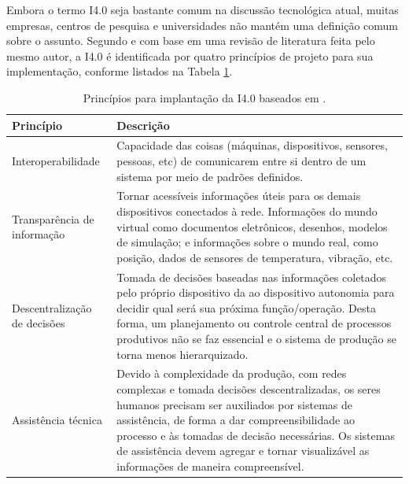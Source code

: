 \documentclass[
	12pt,				%
	oneside,			%
	a4paper,			%
	english,			%
	brazil				%
]{abntex2}
\begin{document}
	Embora o termo I4.0 seja bastante comum na discussão tecnológica atual, muitas empresas, centros de pesquisa e universidades não mantém uma definição comum sobre o assunto. Segundo  e com base em uma revisão de literatura feita pelo mesmo autor, a I4.0 é identificada por quatro princípios de projeto para sua implementação, conforme listados na Tabela \ref{tab:principios-i4}.
	
	
	\begin{table}[H]
		\centering
		\caption{Princípios para implantação da I4.0 baseados em .}
		\begin{tabular}{|p{1.3in}|p{4in}|}
			
			\hline
			\textbf{Princípio}
			&\textbf{Descrição} \\
			
			\hline
			Interoperabilidade
			& Capacidade das coisas (máquinas, dispositivos, sensores, pessoas, etc) de comunicarem entre si dentro de um sistema por meio de padrões definidos. \\
			
			\hline
			Transparência de informação
			& Tornar acessíveis informações úteis para os demais dispositivos conectados à rede. Informações do mundo virtual como documentos eletrônicos, desenhos, modelos de simulação; e informações sobre o mundo real, como posição, dados de sensores de temperatura, vibração, etc. \\
			
			\hline
			Descentralização de decisões
			& Tomada de decisões baseadas nas informações coletados pelo próprio dispositivo da ao dispositivo autonomia para decidir qual será sua próxima função/operação. Desta forma, um planejamento ou controle central de processos produtivos não se faz essencial e o sistema de produção se torna menos hierarquizado. \\
			
			\hline
			Assistência técnica
			& Devido à complexidade da produção, com redes complexas e tomada decisões descentralizadas, os seres humanos precisam ser auxiliados por sistemas de assistência, de forma a dar compreensibilidade ao processo e às tomadas de decisão necessárias. Os sistemas de assistência devem agregar e tornar visualizável as informações de maneira compreensível.  \\
			\hline
			
		\end{tabular}
		\label{tab:principios-i4}
	\end{table}
\end{document}
